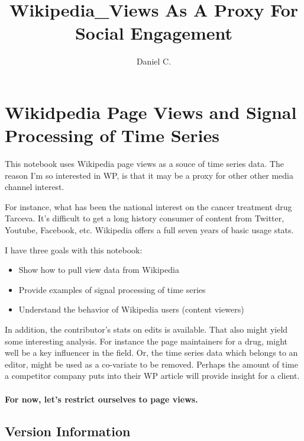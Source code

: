 \documentclass{article}
\title{Wikipedia\_Views As A Proxy For Social Engagement}
\author{Daniel C.}
\begin{document}
    \maketitle




    \section{Wikidpedia Page Views and Signal Processing of Time
Series}\label{wikidpedia-page-views-and-signal-processing-of-time-series}


This notebook uses Wikipedia page views as a souce of time series data.
The reason I'm so interested in WP, is that it may be a proxy for other
other media channel interest.

For instance, what has been the national interest on the cancer
treatment drug Tarceva. It's difficult to get a long history consumer of
content from Twitter, Youtube, Facebook, etc. Wikipedia offers a full
seven years of basic usage stats.

I have three goals with this notebook:

\begin{itemize}
\itemsep1pt\parskip0pt
\item
  Show how to pull view data from Wikipedia
\item
  Provide examples of signal processing of time series
\item
  Understand the behavior of Wikipedia users (content viewers)
\end{itemize}

In addition, the contributor's stats on edits is available. That also
might yield some interesting analysis. For instance the page maintainers
for a drug, might well be a key influencer in the field. Or, the time
series data which belongs to an editor, might be used as a co-variate to
be removed. Perhaps the amount of time a competitor company puts into
their WP article will provide insight for a client.

\paragraph{For now, let's restrict ourselves to page
views.}\label{for-now-lets-restrict-ourselves-to-page-views.}

    \subsection{Version Information}\label{version-information}
\end{document}
